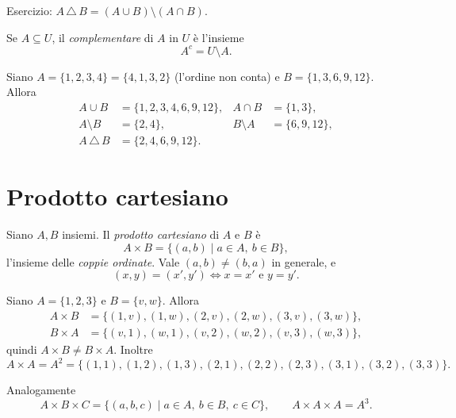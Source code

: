 \documentclass[11pt,a4paper]{article}
\begin{document}
Esercizio: $A \,\triangle\, B = (A \cup B) \setminus (A \cap B)$.

\begin{definizione}
Se $A \subseteq U$, il \emph{complementare} di $A$ in $U$ è l'insieme
\[
A^c = U \setminus A.
\]
\end{definizione}

\begin{esempio}
Siano $A = \{1, 2, 3, 4\} = \{4, 1, 3, 2\}$ (l'ordine non conta) e
$B = \{1, 3, 6, 9, 12\}$. Allora
\begin{align*}
A \cup B &= \{1, 2, 3, 4, 6, 9, 12\}, & A \cap B &= \{1, 3\}, \\
A \setminus B &= \{2, 4\}, & B \setminus A &= \{6, 9, 12\}, \\
A \,\triangle\, B &= \{2, 4, 6, 9, 12\}.
\end{align*}
\end{esempio}

\section{Prodotto cartesiano}

\begin{definizione}
Siano $A, B$ insiemi. Il \emph{prodotto cartesiano} di $A$ e $B$ è
\[
A \times B = \{(a, b) \mid a \in A,\ b \in B\},
\]
l'insieme delle \emph{coppie ordinate}. Vale $(a, b) \neq (b, a)$ in
generale, e
\[
(x, y) = (x', y') \iff x = x' \text{ e } y = y'.
\]
\end{definizione}

\begin{esempio}
Siano $A = \{1, 2, 3\}$ e $B = \{v, w\}$. Allora
\begin{align*}
A \times B &= \{(1,v), (1,w), (2,v), (2,w), (3,v), (3,w)\}, \\
B \times A &= \{(v,1), (w,1), (v,2), (w,2), (v,3), (w,3)\},
\end{align*}
quindi $A \times B \neq B \times A$. Inoltre
\[
A \times A = A^2 = \{(1,1), (1,2), (1,3), (2,1), (2,2), (2,3), (3,1),
(3,2), (3,3)\}.
\]
\end{esempio}

Analogamente
\[
A \times B \times C = \{(a, b, c) \mid a \in A,\ b \in B,\ c \in C\},
\qquad A \times A \times A = A^3.
\]
\end{document}
